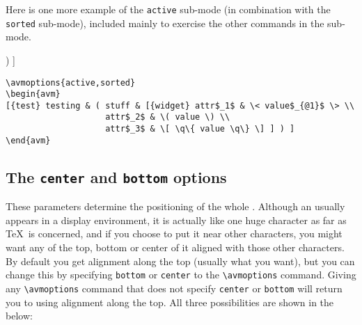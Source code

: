 Here is one more example of the \verb+active+ sub-mode (in
combination with the \verb+sorted+ sub-mode), included mainly to exercise
the other commands in the sub-mode.
%
\begin{examples}
\item
{}
\begin{avm}
[{test} testing & ( stuff & [{widget} attr$_1$ & \< value$_{@1}$ \> \\
                    attr$_2$ & \( value \) \\
                    attr$_3$ & \[ \q\{ value \q\} \] ] ) ]
\end{avm}

\item
{\obeyspaces\begin{verbatim}
\avmoptions{active,sorted}
\begin{avm}
[{test} testing & ( stuff & [{widget} attr$_1$ & \< value$_{@1}$ \> \\
                    attr$_2$ & \( value \) \\
                    attr$_3$ & \[ \q\{ value \q\} \] ] ) ]
\end{avm}
\end{verbatim}}
\end{examples}

\subsection{The {\tt center} and {\tt bottom} options}

These parameters determine the positioning of the whole {\AVM}.  Although
an {\AVM} 
usually appears in a display environment, it is actually like one huge
character as far as \TeX\ is concerned, and if you choose to put it near
other characters, you might want any of the top, bottom or center of it
aligned with those other characters.  By default you get alignment along
the top (usually what you want), but you can change this by specifying
\verb+bottom+ or \verb+center+ to the \verb+\avmoptions+ command.
Giving any \verb+\avmoptions+ command that does not specify \verb+center+
or \verb+bottom+ will return you to using alignment along the top.
All three possibilities are shown in the below:

